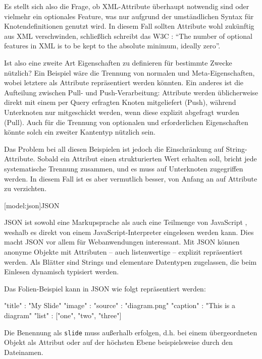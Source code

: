 \documentclass[12pt, a4paper, bibgerm]{scrbook}
\newenvironment{DIFnomarkup}{}{}
\newcommand\icode[1]{\lstinline?#1?}
\newcommand\lsection{}
\begin{document}
Es stellt sich also die Frage, ob XML-Attribute überhaupt notwendig sind
oder vielmehr ein optionales Feature, was nur aufgrund der umständlichen
Syntax für Knotendefinitionen genutzt wird. In diesem Fall
sollten Attribute wohl zukünftig aus XML verschwinden, schließlich
schreibt das W3C \cite{XmlSpec}: "`The number of optional features in XML
is to be kept to the absolute minimum, ideally zero"'.

Ist also eine zweite Art Eigenschaften zu definieren für
bestimmte Zwecke nützlich? Ein Beispiel wäre die Trennung von normalen
und Meta-Eigenschaften, wobei letztere als Attribute repräsentiert
werden könnten. Ein anderes ist die Aufteilung zwischen Pull- und
Push-Verarbeitung: Attribute werden üblicherweise direkt mit einem per
Query erfragten Knoten mitgeliefert (Push), während Unterknoten nur
mitgeschickt werden, wenn diese explizit abgefragt wurden (Pull). Auch
für die Trennung von optionalen und erforderlichen Eigenschaften könnte
solch ein zweiter Kantentyp nützlich sein.

Das Problem bei all diesen Beispielen ist jedoch die Einschränkung auf
String-Attribute. Sobald ein Attribut einen strukturierten Wert erhalten
soll, bricht jede systematische Trennung zusammen, und es muss auf
Unterknoten zugegriffen werden. In diesem Fall ist es aber vermutlich
besser, von Anfang an auf Attribute zu verzichten.

\lsection[model:json]{JSON}

JSON ist sowohl eine Markupsprache als auch eine Teilmenge von
JavaScript \cite{JavaScript}, weshalb es direkt von einem
JavaScript-Interpreter eingelesen werden kann. Dies macht JSON vor allem
für Webanwendungen interessant. Mit JSON können anonyme Objekte mit
Attributen -- auch listenwertige -- explizit repräsentiert werden. Als
Blätter sind Strings und elementare Datentypen zugelassen, die beim
Einlesen dynamisch typisiert werden.

Das Folien-Beispiel kann in JSON wie folgt repräsentiert werden:
\begin{DIFnomarkup}\begin{code}
{
  "title" : "My Slide"
  "image" : {
    "source"  : "diagram.png"
    "caption" : "This is a diagram"
  }
  "list"  : ["one", "two", "three"]
}
\end{code}\end{DIFnomarkup}
Die Benennung als \icode{slide} muss außerhalb erfolgen, d.h. bei einem
übergeordneten Objekt als Attribut oder auf der höchsten Ebene
beispielsweise durch den Dateinamen.
\end{document}

